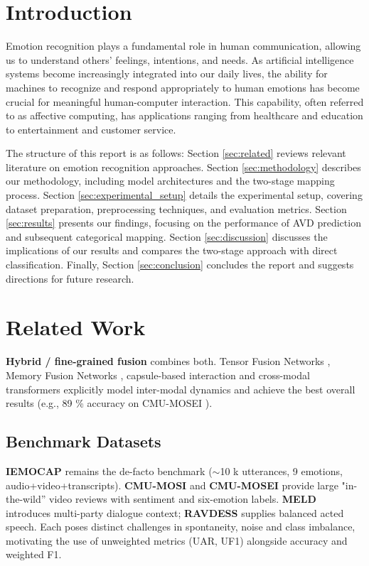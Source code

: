\documentclass[12pt]{article}
\begin{document}

\doublespacing
\section{Introduction}
\label{sec:intro}
Emotion recognition plays a fundamental role in human communication, allowing us to understand others' feelings, intentions, and needs. As artificial intelligence systems become increasingly integrated into our daily lives, the ability for machines to recognize and respond appropriately to human emotions has become crucial for meaningful human-computer interaction. This capability, often referred to as affective computing, has applications ranging from healthcare and education to entertainment and customer service.

The structure of this report is as follows: Section \ref{sec:related} reviews relevant literature on emotion recognition approaches. Section \ref{sec:methodology} describes our methodology, including model architectures and the two-stage mapping process. Section \ref{sec:experimental_setup} details the experimental setup, covering dataset preparation, preprocessing techniques, and evaluation metrics. Section \ref{sec:results} presents our findings, focusing on the performance of AVD prediction and subsequent categorical mapping. Section \ref{sec:discussion} discusses the implications of our results and compares the two-stage approach with direct classification. Finally, Section \ref{sec:conclusion} concludes the report and suggests directions for future research.\section{Related Work}
\label{sec:related_work}

\textbf{Hybrid / fine-grained fusion} combines both.  Tensor Fusion
Networks \cite{zadeh2018multimodal_tfn}, Memory Fusion Networks
\cite{zadeh2018mfn}, capsule-based interaction
\cite{wang2019words} and cross-modal transformers
\cite{tsai2019mult} explicitly model inter-modal dynamics and achieve
the best overall results (e.g., 89 \% accuracy on CMU-MOSEI
\cite{mittal2020m3er}).

\subsection{Benchmark Datasets}
\textbf{IEMOCAP} \cite{busso2008iemocap} remains the de-facto benchmark
($\sim$10 k utterances, 9 emotions, audio+video+transcripts).  
\textbf{CMU-MOSI} \cite{zadeh2016mosi} and
\textbf{CMU-MOSEI} \cite{zadeh2018multimodal} provide large
"in-the-wild'' video reviews with sentiment and six-emotion labels.
\textbf{MELD} \cite{poria2018meld} introduces multi-party dialogue
context; \textbf{RAVDESS} \cite{livingstone2018ryerson} supplies
balanced acted speech.  Each poses distinct challenges in spontaneity,
noise and class imbalance, motivating the use of unweighted metrics
(UAR, UF1) alongside accuracy and weighted F1.
\end{document}
